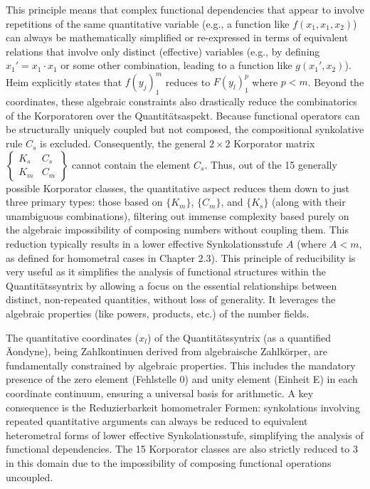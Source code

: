 \documentclass[12pt]{article}
\newcommand{\synkolationsstufe}{m}
\begin{document}
\begin{itemize}
    This principle means that complex functional dependencies that appear to involve repetitions of the same quantitative variable (e.g., a function like \( f(x_1, x_1, x_2) \)) can always be mathematically simplified or re-expressed in terms of equivalent relations that involve only distinct (effective) variables (e.g., by defining \(x_1' = x_1 \cdot x_1\) or some other combination, leading to a function like \(g(x_1', x_2)\)). Heim explicitly states that $f(y_j)_1^m$ reduces to $F(y_l)_1^p$ where $p<m$. Beyond the coordinates, these algebraic constraints also drastically reduce the combinatorics of the Korporatoren over the Quantitätsaspekt. Because functional operators can be structurally uniquely coupled but not composed, the compositional synkolative rule $C_s$ is excluded. Consequently, the general $2 \times 2$ Korporator matrix $\begin{Bmatrix} K_s & C_s \\ K_m & C_m \end{Bmatrix}$ cannot contain the element $C_s$. Thus, out of the 15 generally possible Korporator classes, the quantitative aspect reduces them down to just three primary types: those based on $\{K_m\}$, $\{C_m\}$, and $\{K_s\}$ (along with their unambiguous combinations), filtering out immense complexity based purely on the algebraic impossibility of composing numbers without coupling them. This reduction typically results in a lower effective Synkolationsstufe \( A \) (where \( A < \synkolationsstufe \), as defined for homometral cases in Chapter 2.3). This principle of reducibility is very useful as it simplifies the analysis of functional structures within the Quantitätssyntrix by allowing a focus on the essential relationships between distinct, non-repeated quantities, without loss of generality. It leverages the algebraic properties (like powers, products, etc.) of the number fields.
\end{itemize}

The quantitative coordinates (\(x_l\)) of the Quantitätssyntrix (as a quantified Äondyne), being Zahlkontinuen derived from algebraische Zahlkörper, are fundamentally constrained by algebraic properties. This includes the mandatory presence of the zero element (Fehlstelle 0) and unity element (Einheit E) in each coordinate continuum, ensuring a universal basis for arithmetic. A key consequence is the Reduzierbarkeit homometraler Formen: synkolations involving repeated quantitative arguments can always be reduced to equivalent heterometral forms of lower effective Synkolationsstufe, simplifying the analysis of functional dependencies. The 15 Korporator classes are also strictly reduced to 3 in this domain due to the impossibility of composing functional operations uncoupled.
\end{document}
